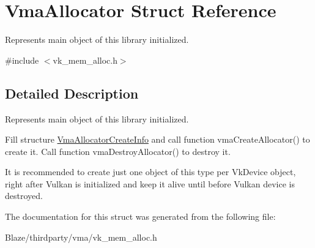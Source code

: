 \hypertarget{structVmaAllocator}{}\section{Vma\+Allocator Struct Reference}
\label{structVmaAllocator}


Represents main object of this library initialized.  




{\ttfamily \#include $<$vk\+\_\+mem\+\_\+alloc.\+h$>$}



\subsection{Detailed Description}
Represents main object of this library initialized. 

Fill structure \hyperlink{structVmaAllocatorCreateInfo}{Vma\+Allocator\+Create\+Info} and call function vma\+Create\+Allocator() to create it. Call function vma\+Destroy\+Allocator() to destroy it.

It is recommended to create just one object of this type per {\ttfamily Vk\+Device} object, right after Vulkan is initialized and keep it alive until before Vulkan device is destroyed. 

The documentation for this struct was generated from the following file\+:\begin{DoxyCompactItemize}
\item 
Blaze/thirdparty/vma/vk\+\_\+mem\+\_\+alloc.\+h\end{DoxyCompactItemize}
